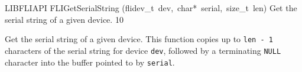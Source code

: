\documentclass{article}
\begin{document}
\begin{cxxfunction}
{LIBFLIAPI}
        {FLIGetSerialString}
        {(flidev\_t\ dev,\ char*\ serial,\ size\_t\ len)}
        {
 Get the serial string of a given device.}
        {10}
\begin{cxxdoc}

Get the serial string of a given device.  This function copies up to
\texttt{len - 1} characters of the serial string for device
\texttt{dev}, followed by a terminating \texttt{NULL} character
into the buffer pointed to by \texttt{serial}.


\end{cxxdoc}
\end{cxxfunction}
\end{document}
